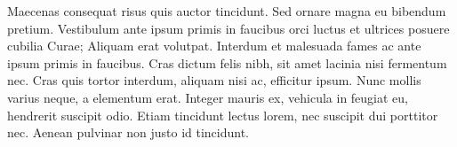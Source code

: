 Maecenas consequat risus quis auctor tincidunt. Sed ornare magna eu bibendum pretium. Vestibulum ante ipsum primis in faucibus orci luctus et ultrices posuere cubilia Curae; Aliquam erat volutpat. Interdum et malesuada fames ac ante ipsum primis in faucibus. Cras dictum felis nibh, sit amet lacinia nisi fermentum nec. Cras quis tortor interdum, aliquam nisi ac, efficitur ipsum. Nunc mollis varius neque, a elementum erat. Integer mauris ex, vehicula in feugiat eu, hendrerit suscipit odio. Etiam tincidunt lectus lorem, nec suscipit dui porttitor nec. Aenean pulvinar non justo id tincidunt. 
